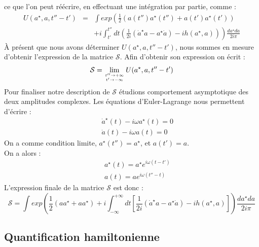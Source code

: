 \documentclass[a4paper,11pt]{article}
\theoremstyle{plain}
\theoremstyle{definition}
\theoremstyle{remark}
\numberwithin{equation}{section}
\numberwithin{equation}{subsection}
\numberwithin{figure}{section}
\begin{document}
ce que l'on peut réécrire, en effectuant une intégration par partie, comme :
\begin{eqnarray}
 U(a^{\star} , a, t''-t') &=& \int exp \left(  \frac{1}{2} \left( a(t'') a^{\star}(t'') + a(t') a^{\star}(t') \right)  \right. \nonumber \\
&& \left. + i \int_{t'}^{t''} dt \left( \frac{1}{2i} \left(\dot{a}^{\star}a - a^{\star} \dot{a} \right) - i h(a^{\star},a) \right) \right) 
\frac{da^{\star} da}{2i \pi}
\end{eqnarray}
À présent que nous avons déterminer $U(a^{\star} , a, t''-t') $, nous sommes en mesure d'obtenir l'expression de la matrice  $\mathcal{S}$. Afin d'obtenir son expression on écrit : 
\begin{eqnarray}
 \mathcal{S} = \lim_{t'' \to + \infty \atop t' \to - \infty} U(a^{\star} , a, t''-t')
\end{eqnarray}
Pour finaliser notre description de $\mathcal{S}$ étudions comportement asymptotique des deux amplitudes complexes. Les équations d'Euler-Lagrange nous permettent d'écrire :
\begin{eqnarray}
 &&\dot{a}^{\star}(t) - i \omega a^{\star}(t) = 0 \\
 &&\dot{a}(t) - i \omega a(t) = 0 
\end{eqnarray}
On a comme condition limite, $a^{\star}(t'') = a^{\star}$, et $a(t')=a$.\\
On a alors :
\begin{eqnarray}
 &&a^{\star}(t) = a^{\star} e^{ i \omega (t - t') }\\
 &&a(t) = a e^{ i \omega (t'' - t) }
\end{eqnarray}
L'expression finale de la matrice $\mathcal{S}$ est donc :
\begin{equation}
 \mathcal{S} = \int exp \left(  \frac{1}{2} \left( a a^{\star} + a a^{\star} \right)  
+ i \int_{-\infty}^{+ \infty} dt \left[ \frac{1}{2i} \left(\dot{a}^{\star}a - a^{\star} \dot{a} \right) - i h(a^{\star},a) \right] \right) 
\frac{da^{\star} da}{2i \pi}
\end{equation}

\subsection{Quantification hamiltonienne}
\end{document}
